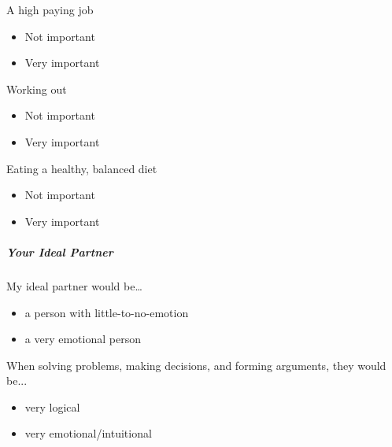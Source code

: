 \documentclass[twoside]{report}
\begin{document}
\begin{multicols}{2}
A high paying job

\begin{itemize}
\item
  Not important
\end{itemize}

\begin{itemize}
\item
  Very important
\end{itemize}

Working out

\begin{itemize}
\item
  Not important
\end{itemize}

\begin{itemize}
\item
  Very important
\end{itemize}

Eating a healthy, balanced diet

\begin{itemize}
\item
  Not important
\end{itemize}

\begin{itemize}
\item
  Very important
\end{itemize}

\subparagraph{Your Ideal Partner}

My ideal partner would be\ldots{}

\begin{itemize}
\item
  a person with little-to-no-emotion
\end{itemize}

\begin{itemize}
\item
  a very emotional person
\end{itemize}

When solving problems, making decisions, and forming arguments, they
would be...

\begin{itemize}
\item
  very logical
\end{itemize}

\begin{itemize}
\item
  very emotional/intuitional
\end{itemize}


\end{multicols}
\end{document}
